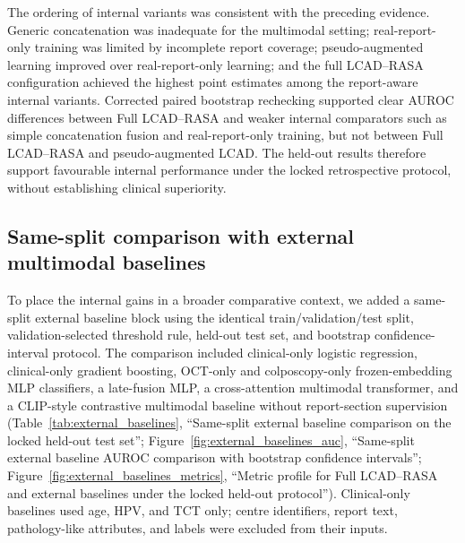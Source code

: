 The ordering of internal variants was consistent with the preceding evidence. Generic concatenation was inadequate for the multimodal setting; real-report-only training was limited by incomplete report coverage; pseudo-augmented learning improved over real-report-only learning; and the full LCAD--RASA configuration achieved the highest point estimates among the report-aware internal variants. Corrected paired bootstrap rechecking supported clear AUROC differences between Full LCAD--RASA and weaker internal comparators such as simple concatenation fusion and real-report-only training, but not between Full LCAD--RASA and pseudo-augmented LCAD. The held-out results therefore support favourable internal performance under the locked retrospective protocol, without establishing clinical superiority.

\subsection{Same-split comparison with external multimodal baselines}
\label{subsec:external_baseline_results}

To place the internal gains in a broader comparative context, we added a same-split external baseline block using the identical train/validation/test split, validation-selected threshold rule, held-out test set, and bootstrap confidence-interval protocol. The comparison included clinical-only logistic regression, clinical-only gradient boosting, OCT-only and colposcopy-only frozen-embedding MLP classifiers, a late-fusion MLP, a cross-attention multimodal transformer, and a CLIP-style contrastive multimodal baseline without report-section supervision (Table~\ref{tab:external_baselines}, ``Same-split external baseline comparison on the locked held-out test set''; Figure~\ref{fig:external_baselines_auc}, ``Same-split external baseline AUROC comparison with bootstrap confidence intervals''; Figure~\ref{fig:external_baselines_metrics}, ``Metric profile for Full LCAD--RASA and external baselines under the locked held-out protocol''). Clinical-only baselines used age, HPV, and TCT only; centre identifiers, report text, pathology-like attributes, and labels were excluded from their inputs.

